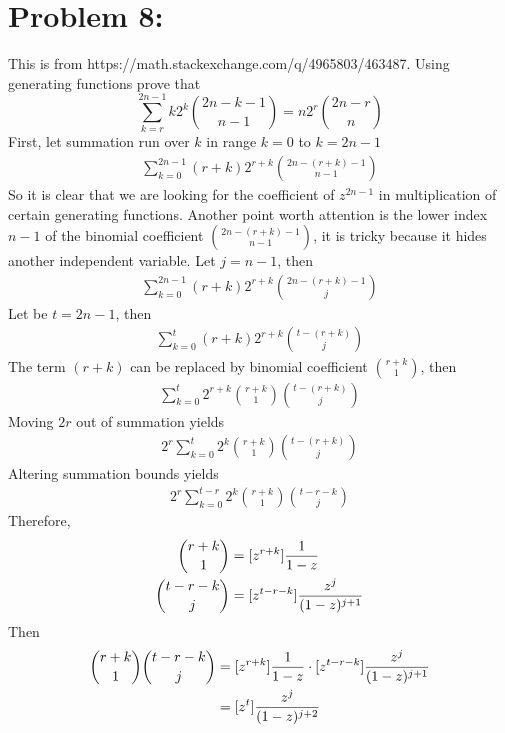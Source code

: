 ﻿\section{Problem 8: }
\label{sec:problem-8}
This is from https://math.stackexchange.com/q/4965803/463487.
Using generating functions prove that
\begin{equation}
    \sum_{k=r}^{2n-1} k2^k \binom{2n-k-1}{n-1} = n2^r \binom{2n-r}{n}
    \label{eq:problem-8}
\end{equation}
First, let summation run over $k$ in range $k=0$ to $k=2n-1$
\begin{align*}
    \sum_{k=0}^{2n-1} (r+k) 2^{r+k} \binom{2n-(r+k)-1}{n-1}
\end{align*}
So it is clear that we are looking for the coefficient of $z^{2n-1}$ in multiplication of certain generating functions.
Another point worth attention is the lower index $n-1$ of the binomial coefficient $\binom{2n-(r+k)-1}{n-1}$,
it is tricky because it hides another independent variable.
Let $j=n-1$, then
\begin{align*}
    \sum_{k=0}^{2n-1} (r+k) 2^{r+k} \binom{2n-(r+k)-1}{j}
\end{align*}
Let be $t=2n-1$, then
\begin{align*}
    \sum_{k=0}^{t} (r+k) 2^{r+k} \binom{t-(r+k)}{j}
\end{align*}
The term $(r+k)$ can be replaced by binomial coefficient $\binom{r+k}{1}$, then
\begin{align*}
    \sum_{k=0}^{t} 2^{r+k} \binom{r+k}{1} \binom{t-(r+k)}{j}
\end{align*}
Moving $2r$ out of summation yields
\begin{align*}
    2^r \sum_{k=0}^{t} 2^{k} \binom{r+k}{1} \binom{t-(r+k)}{j}
\end{align*}
Altering summation bounds yields
\begin{align*}
    2^r \sum_{k=0}^{t-r} 2^{k} \binom{r+k}{1} \binom{t-r-k}{j}
\end{align*}
Therefore,
\begin{align*}
    \binom{r+k}{1} &= [z^{r+k}] \frac{1}{1-z} \\
    \binom{t-r-k}{j} &= [z^{t-r-k}] \frac{z^j}{(1-z)^{j+1}}
\end{align*}
Then
\begin{align*}
    \binom{r+k}{1} \binom{t-r-k}{j} &= [z^{r+k}] \frac{1}{1-z} \cdot [z^{t-r-k}] \frac{z^j}{(1-z)^{j+1}} \\
    &= [z^{t}] \frac{z^j}{(1-z)^{j+2}}
\end{align*}
